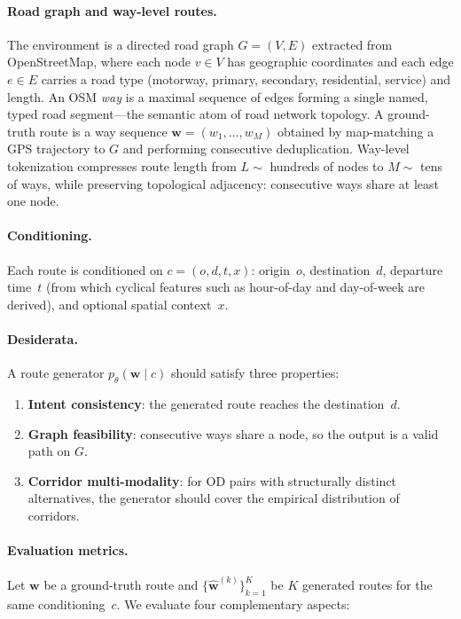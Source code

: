 
\paragraph{Road graph and way-level routes.}
The environment is a directed road graph $G=(V,E)$ extracted from OpenStreetMap, where each node $v \in V$ has geographic coordinates and each edge $e \in E$ carries a road type (motorway, primary, secondary, residential, service) and length.
An OSM \emph{way} is a maximal sequence of edges forming a single named, typed road segment---the semantic atom of road network topology.
A ground-truth route is a way sequence $\mathbf{w} = (w_1, \dots, w_M)$ obtained by map-matching a GPS trajectory to $G$ and performing consecutive deduplication.
Way-level tokenization compresses route length from $L \sim$ hundreds of nodes to $M \sim$ tens of ways, while preserving topological adjacency: consecutive ways share at least one node.

\paragraph{Conditioning.}
Each route is conditioned on $c = (o, d, t, x)$: origin~$o$, destination~$d$, departure time~$t$ (from which cyclical features such as hour-of-day and day-of-week are derived), and optional spatial context~$x$.

\paragraph{Desiderata.}
A route generator $p_\theta(\mathbf{w} \mid c)$ should satisfy three properties:
\begin{enumerate}
  \item \textbf{Intent consistency}: the generated route reaches the destination~$d$.
  \item \textbf{Graph feasibility}: consecutive ways share a node, so the output is a valid path on $G$.
  \item \textbf{Corridor multi-modality}: for OD pairs with structurally distinct alternatives, the generator should cover the empirical distribution of corridors.
\end{enumerate}

\paragraph{Evaluation metrics.}
Let $\mathbf{w}$ be a ground-truth route and $\{\hat{\mathbf{w}}^{(k)}\}_{k=1}^K$ be $K$ generated routes for the same conditioning~$c$.
We evaluate four complementary aspects:

